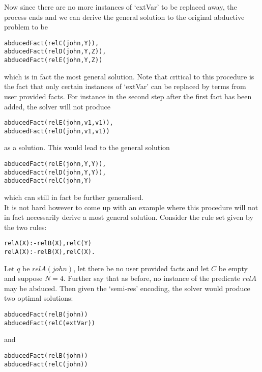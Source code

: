 Now since there are no more instances of ‘extVar’ to be replaced away, the process ends and we can derive the general solution to the original abductive problem to be 
\begin{lstlisting}[frame = none]
abducedFact(relC(john,Y)), 
abducedFact(relD(john,Y,Z)), 
abducedFact(relE(john,Y,Z)) 
\end{lstlisting}
which is in fact the most general solution. Note that critical to this procedure is the fact that only certain instances of ‘extVar’ can be replaced by terms from user provided facts. For instance in the second step after the first fact has been added, the solver will not produce 
\begin{lstlisting}[frame = none]
abducedFact(relE(john,v1,v1)),
abducedFact(relD(john,v1,v1))
\end{lstlisting}
as a solution. This would lead to the general solution \begin{lstlisting}[frame = none]
abducedFact(relE(john,Y,Y)),
abducedFact(relD(john,Y,Y)),
abducedFact(relC(john,Y)
\end{lstlisting} which can still in fact be further generalised.\\ It is not hard however to come up with an example where this procedure will not in fact necessarily derive a most general solution. Consider the rule set given by the two rules:
\begin{lstlisting}[frame = none]
relA(X):-relB(X),relC(Y)
relA(X):-relB(X),relC(X).
\end{lstlisting}
Let $q$ be $relA(john)$, let there be no user provided facts and let $C$ be empty and suppose $N = 4$. Further say that as before, no instance of the predicate $relA$ may be abduced. Then given the ‘semi-res’ encoding, the solver would produce two optimal solutions:
\begin{lstlisting}[frame = none]
abducedFact(relB(john))
abducedFact(relC(extVar))
\end{lstlisting} and 
\begin{lstlisting}[frame = none]
abducedFact(relB(john))
abducedFact(relC(john))
\end{lstlisting}

